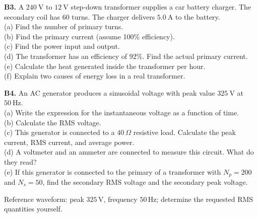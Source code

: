 \begin{exercisebox}[24]
\vspace{0.4cm}

\textbf{B3.} A $240\ \text{V}$ to $12\ \text{V}$
step-down transformer supplies a car battery charger.
The secondary coil has $60$ turns. The charger
delivers $5.0\ \text{A}$ to the battery.\\[4pt]
(a) Find the number of primary turns.\\
(b) Find the primary current (assume 100\%
efficiency).\\
(c) Find the power input and output.\\
(d) The transformer has an efficiency of $92\%$.
Find the actual primary current.\\
(e) Calculate the heat generated inside the
transformer per hour.\\
(f) Explain two causes of energy loss in a
real transformer.
\hfill{}

\vspace{0.4cm}

\textbf{B4.} An AC generator produces a sinusoidal
voltage with peak value $325\ \text{V}$ at
$50\ \text{Hz}$.\\[4pt]
(a) Write the expression for the instantaneous
voltage as a function of time.\\
(b) Calculate the RMS voltage.\\
(c) This generator is connected to a $40\ \Omega$
resistive load. Calculate the peak current, RMS
current, and average power.\\
(d) A voltmeter and an ammeter are connected to
measure this circuit. What do they read?\\
(e) If this generator is connected to the primary
of a transformer with $N_p = 200$ and $N_s = 50$,
find the secondary RMS voltage and the secondary
peak voltage.
\hfill{}

\begin{center}
\par\footnotesize Reference waveform: peak $325\,\text{V}$, frequency $50\,\text{Hz}$; determine the requested RMS quantities yourself.
\end{center}


\end{exercisebox}
